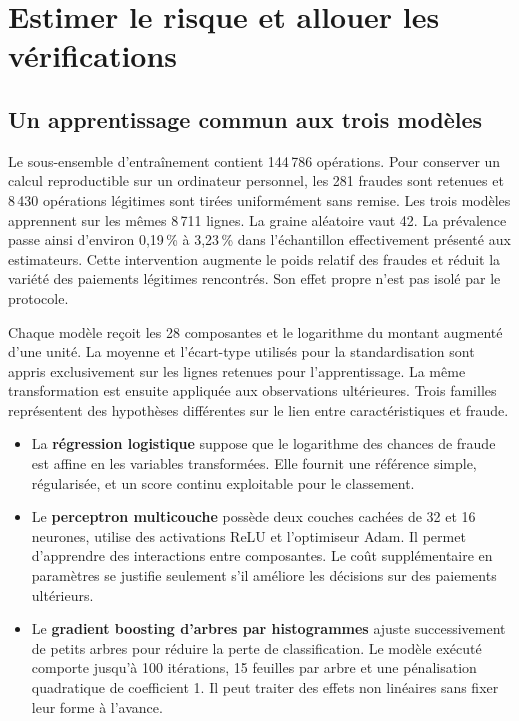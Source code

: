 \documentclass[11pt,a4paper]{article}
\begin{document}
\section{Estimer le risque et allouer les vérifications}\label{sec:decision}

\subsection{Un apprentissage commun aux trois modèles}
Le sous-ensemble d'entraînement contient 144\,786 opérations. Pour conserver un calcul reproductible sur un ordinateur personnel, les 281 fraudes sont retenues et 8\,430 opérations légitimes sont tirées uniformément sans remise. Les trois modèles apprennent sur les mêmes 8\,711 lignes. La graine aléatoire vaut 42. La prévalence passe ainsi d'environ 0,19\,\% à 3,23\,\% dans l'échantillon effectivement présenté aux estimateurs. Cette intervention augmente le poids relatif des fraudes et réduit la variété des paiements légitimes rencontrés. Son effet propre n'est pas isolé par le protocole.

Chaque modèle reçoit les 28 composantes et le logarithme du montant augmenté d'une unité. La moyenne et l'écart-type utilisés pour la standardisation sont appris exclusivement sur les lignes retenues pour l'apprentissage. La même transformation est ensuite appliquée aux observations ultérieures. Trois familles représentent des hypothèses différentes sur le lien entre caractéristiques et fraude.

\begin{itemize}
\item La \textbf{régression logistique} suppose que le logarithme des chances de fraude est affine en les variables transformées. Elle fournit une référence simple, régularisée, et un score continu exploitable pour le classement.
\item Le \textbf{perceptron multicouche} possède deux couches cachées de 32 et 16 neurones, utilise des activations ReLU et l'optimiseur Adam. Il permet d'apprendre des interactions entre composantes. Le coût supplémentaire en paramètres se justifie seulement s'il améliore les décisions sur des paiements ultérieurs.
\item Le \textbf{gradient boosting d'arbres par histogrammes} ajuste successivement de petits arbres pour réduire la perte de classification. Le modèle exécuté comporte jusqu'à 100 itérations, 15 feuilles par arbre et une pénalisation quadratique de coefficient 1. Il peut traiter des effets non linéaires sans fixer leur forme à l'avance.
\end{itemize}
\end{document}
